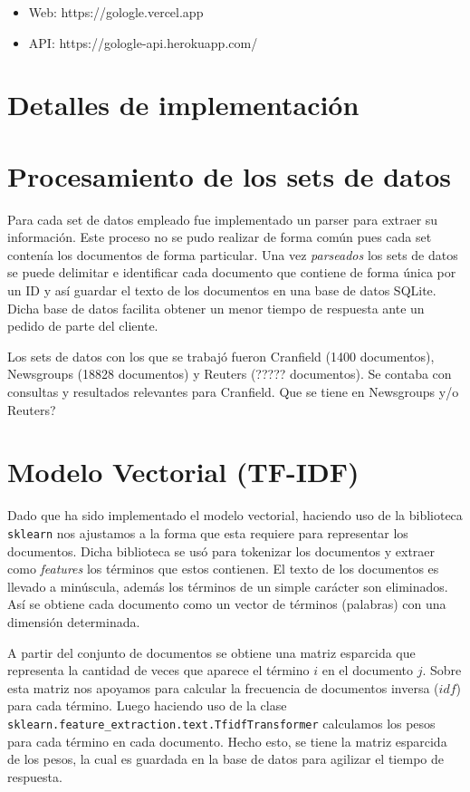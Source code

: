 \documentclass[12pt]{llncs}
\begin{document}
\begin{itemize}
  \item Web: https://gologle.vercel.app
  \item API: https://gologle-api.herokuapp.com/
\end{itemize}

\section*{Detalles de implementación}

\section{Procesamiento de los sets de datos}

Para cada set de datos empleado fue implementado un parser para extraer su información. Este proceso no se pudo realizar de forma común pues cada set contenía los documentos de forma particular. Una vez \textit{parseados} los sets de datos se puede delimitar e identificar cada documento que contiene de forma única por un ID y así guardar el texto de los documentos en una base de datos SQLite. Dicha base de datos facilita obtener un menor tiempo de respuesta ante un pedido de parte del cliente.

Los sets de datos con los que se trabajó fueron Cranfield (1400 documentos), Newsgroups (18828 documentos) y Reuters (????? documentos). Se contaba con consultas y resultados relevantes para Cranfield. {\color{red}Que se tiene en Newsgroups y/o Reuters?}

\section{Modelo Vectorial (TF-IDF)}

Dado que ha sido implementado el modelo vectorial, haciendo uso de la biblioteca \verb+sklearn+ nos ajustamos a la forma que esta requiere para representar los documentos. Dicha biblioteca se usó para tokenizar los documentos y extraer como \textit{features} los términos que estos contienen. El texto de los documentos es llevado a minúscula, además los términos de un simple carácter son eliminados. Así se obtiene cada documento como un vector de términos (palabras) con una dimensión determinada.

A partir del conjunto de documentos se obtiene una matriz esparcida que representa la cantidad de veces que aparece el término $i$ en el documento $j$. Sobre esta matriz nos apoyamos para calcular la frecuencia de documentos inversa ($idf$) para cada término. Luego haciendo uso de la clase \verb+sklearn.feature_extraction.text.TfidfTransformer+ calculamos los pesos para cada término en cada documento. Hecho esto, se tiene la matriz esparcida de los pesos, la cual es guardada en la base de datos para agilizar el tiempo de respuesta.
\end{document}
